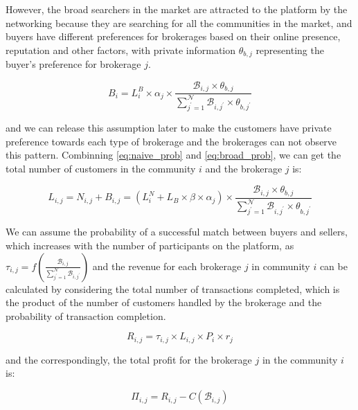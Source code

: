 \documentclass[12pt]{article}
\begin{document}
However, the broad searchers in the market are attracted to the platform by the networking because they are searching for all the communities in the market, and buyers have different preferences for brokerages based on their online presence, reputation and other factors, with private information $\theta_{b, j}$ representing the buyer's preference for brokerage $j$.

\begin{equation}
  B_i = L^B_i \times \alpha_j \times \frac{\mathcal{B}_{i, j} \times \theta_{b, j}}{\sum_{j^\prime=1}^{\mathcal{N}}\mathcal{B}_{i, j^\prime} \times \theta_{b, j^\prime}} \label{eq:broad_prob}
\end{equation}

and we can release this assumption later to make the customers have private preference towards each type of brokerage and the brokerages can not observe this pattern. Combinning \eqref{eq:naive_prob} and \eqref{eq:broad_prob}, we can get the total number of customers in the community $i$ and the brokerage $j$ is:

\begin{equation}
  L_{i, j} = N_{i, j} + B_{i, j} = (L^N_i + L_B \times \beta \times \alpha_j) \times \frac{\mathcal{B}_{i, j} \times \theta_{b, j}}{\sum_{j^\prime=1}^{\mathcal{N}}\mathcal{B}_{i, j^\prime} \times \theta_{b, j^\prime}}
   \label{eq:total_prob}
\end{equation}

We can assume the probability of a successful match between buyers and sellers, which increases with the number of participants on the platform, as $\tau_{i, j} = f(\frac{\mathcal{B}_{i, j}}{\sum_{j^\prime=1}^{\mathcal{N}}\mathcal{B}_{i, j^\prime}})$ and the revenue for each brokerage $j$ in community $i$ can be calculated by considering the total number of transactions completed, which is the product of the number of customers handled by the brokerage and the probability of transaction completion.

\begin{equation}
  R_{i, j} = \tau_{i, j} \times L_{i, j} \times P_i \times r_j \label{eq:revenue}
\end{equation}

and the correspondingly, the total profit for the brokerage $j$ in the community $i$ is:

\begin{equation}
  \Pi_{i, j} = R_{i, j} - C(\mathcal{B}_{i, j}) \label{eq:profit}
\end{equation}
\end{document}
